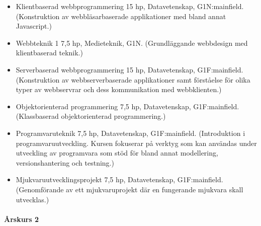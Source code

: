 \documentclass[swedish]{LnuCmThesis}
\begin{document}
\begin{itemize}
    \item Klientbaserad webbprogrammering 15 hp, Datavetenskap, G1N\fn:mainfield{}. (Konstruktion av webbläsarbaserade applikationer med bland annat Javascript.)
    \item Webbteknik 1 7,5 hp, Medieteknik, G1N. (Grundläggande webbdesign med klientbaserad teknik.)
    \item Serverbaserad webbprogrammering 15 hp, Datavetenskap, G1F\fn:mainfield{}. (Konstruktion av webbserverbaserade applikationer samt förståelse för olika typer av webbservrar och dess kommunikation med webbklienten.)
    \item Objektorienterad programmering 7,5 hp, Datavetenskap, G1F\fn:mainfield{}. (Klassbaserad objektorienterad programmering.)
    \item Programvaruteknik 7,5 hp, Datavetenskap, G1F\fn:mainfield{}. (Introduktion i programvaruutveckling. Kursen fokuserar på verktyg som kan användas under utveckling av programvara som stöd för bland annat modellering, versionshantering och testning.)
    \item Mjukvaruutvecklingsprojekt 7,5 hp, Datavetenskap, G1F\fn:mainfield{}. (Genomförande av ett mjukvaruprojekt där en fungerande mjukvara skall utvecklas.)
\end{itemize}

\paragraph*{Årskurs 2}
\end{document}
